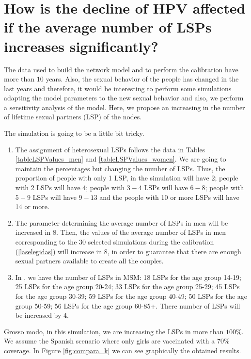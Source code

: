 \section{How is the decline of HPV affected if the average number of LSPs increases significantly?}

The data used to build the network model and to perform the calibration have more than $10$ years. Also, the sexual behavior of the people has changed in the last years and therefore, it would be interesting to perform some simulations adapting the model parameters to the new sexual behavior and also, we perform a sensitivity analysis of the model. Here, we propose an increasing in the number of lifetime sexual partners (LSP) of the nodes.

The simulation is going to be a little bit tricky. 

\begin{enumerate}
	\item The assignment of heterosexual LSPs follows the data in Tables \ref{tableLSPValues_men} and \ref{tableLSPValues_women}. We are going to maintain the percentages but changing the number of LSPs. Thus, the proportion of people with only 1 LSP, in the simulation will have 2; people with 2 LSPs will have 4; people with $3-4$ LSPs will have $6-8$; people with $5-9$ LSPs will have $9-13$ and the people with 10 or more LSPs will have 14 or more.
	\item The parameter determining the average number of LSPs in men will be increased in 8. Then, the values of the average number of LSPs in men corresponding to the $30$ selected simulations during the calibration (\ref{laselegidas}) will increase in 8, in order to guarantee that there are enough sexual partners available to create all the couples.
	\item In \cite{Durex2002}, we have the number of LSPs in MSM: 18 LSPs for the age group 14-19; 25 LSPs for the age group 20-24; 33 LSPs for the age group 25-29; 45 LSPs for the age group 30-39; 59 LSPs for the age group 40-49; 50 LSPs for the age group 50-59; 56 LSPs for the age group 60-85+. There number of LSPs will be increased by 4.   
\end{enumerate}

Grosso modo, in this simulation, we are increasing the LSPs in more than $100\%$. We assume the Spanish scenario where only girls are vaccinated with a $70\%$ coverage. In Figure \ref{fig:compara_k} we can see graphically the obtained results. 

